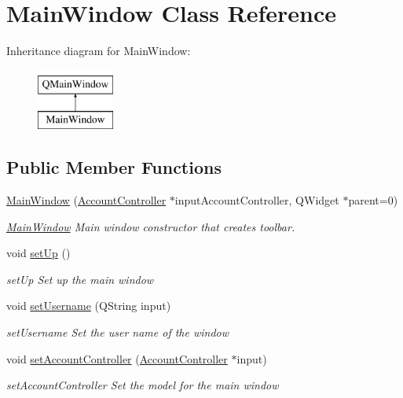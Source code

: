 \hypertarget{classMainWindow}{}\section{Main\+Window Class Reference}
\label{classMainWindow}
Inheritance diagram for Main\+Window\+:\begin{figure}[H]
\begin{center}
\leavevmode
\includegraphics[height=2.000000cm]{classMainWindow}
\end{center}
\end{figure}
\subsection*{Public Member Functions}
\begin{DoxyCompactItemize}
\item 
\hyperlink{classMainWindow_aeb4f3cd086c700187210e8f99963ca40}{Main\+Window} (\hyperlink{classAccountController}{Account\+Controller} $\ast$input\+Account\+Controller, Q\+Widget $\ast$parent=0)
\begin{DoxyCompactList}\small\item\em \hyperlink{classMainWindow}{Main\+Window} Main window constructor that creates toolbar. \end{DoxyCompactList}\item 
void \hyperlink{classMainWindow_af38799531b6962dc5b987b3fe3e0b013}{set\+Up} ()\hypertarget{classMainWindow_af38799531b6962dc5b987b3fe3e0b013}{}\label{classMainWindow_af38799531b6962dc5b987b3fe3e0b013}

\begin{DoxyCompactList}\small\item\em set\+Up Set up the main window \end{DoxyCompactList}\item 
void \hyperlink{classMainWindow_af4058d65d335d1c572139943942e1ed2}{set\+Username} (Q\+String input)
\begin{DoxyCompactList}\small\item\em set\+Username Set the user name of the window \end{DoxyCompactList}\item 
void \hyperlink{classMainWindow_abba4cc95e38e5ca017657496046db0f5}{set\+Account\+Controller} (\hyperlink{classAccountController}{Account\+Controller} $\ast$input)
\begin{DoxyCompactList}\small\item\em set\+Account\+Controller Set the model for the main window \end{DoxyCompactList}\end{DoxyCompactItemize}


